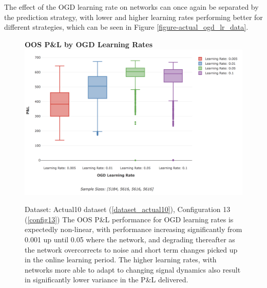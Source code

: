 \documentclass[a4paper,11pt,oneside]{article}
\theoremstyle{plain}
\theoremstyle{definition}
\begin{document}
	The effect of the OGD learning rate on networks can once again be separated by the prediction strategy, with lower and higher learning rates performing better for different strategies, which can be seen in Figure \ref{figure-actual_ogd_lr_data}.\newline
	
	\begin{figure}[H]
		\textbf{OOS P\&L by OGD Learning Rates}
		\centering
		\includegraphics[scale=0.45]{images/results/network/lr/actual_ogd_lr.png}
		\caption[OOS P\&L by OGD Learning Rates]
		{Dataset: Actual10 dataset (\ref{dataset_actual10}), Configuration 13 (\ref{config13})
			\newline The OOS P\&L performance for OGD learning rates is expectedly non-linear, with performance increasing significantly from 0.001 up until 0.05 where the network, and degrading thereafter as the network overcorrects to noise and short term changes picked up in the online learning period. The higher learning rates, with networks more able to adapt to changing signal dynamics also result in significantly lower variance in the P\&L delivered. }
		\label{figure-actual_ogd_lr}
	\end{figure}
\end{document}
